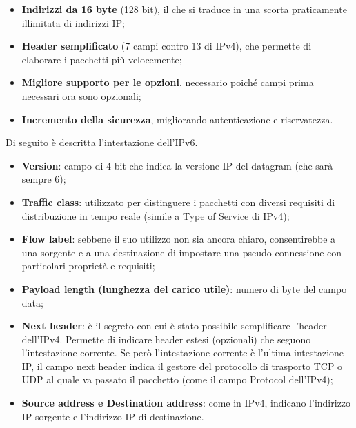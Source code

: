             \begin{itemize}
                \item \textbf{Indirizzi da 16 byte} (128 bit), il che si traduce in una scorta praticamente illimitata di
                indirizzi IP;

                \item \textbf{Header semplificato} (7 campi contro 13 di IPv4), che permette di elaborare i pacchetti
                più velocemente;

                \item \textbf{Migliore supporto per le opzioni}, necessario poiché campi prima necessari ora sono
                opzionali;

                \item \textbf{Incremento della sicurezza}, migliorando autenticazione e riservatezza.                
            \end{itemize}

            Di seguito è descritta l’intestazione dell’IPv6.
            
            \begin{itemize}
                \item \textbf{Version}: campo di 4 bit che indica la versione IP del datagram (che sarà sempre 6);
                
                \item \textbf{Traffic class}: utilizzato per distinguere i pacchetti con diversi requisiti di distribuzione
                in tempo reale (simile a Type of Service di IPv4);

                \item \textbf{Flow label}: sebbene il suo utilizzo non sia ancora chiaro, consentirebbe a una sorgente e
                a una destinazione di impostare una pseudo-connessione con particolari proprietà e
                requisiti;

                \item \textbf{Payload length (lunghezza del carico utile)}: numero di byte del campo data;
                
                \item \textbf{Next header}: è il segreto con cui è stato possibile semplificare l’header dell’IPv4.
                Permette di indicare header estesi (opzionali) che seguono l’intestazione corrente. Se
                però l’intestazione corrente è l’ultima intestazione IP, il campo next header indica il
                gestore del protocollo di trasporto TCP o UDP al quale va passato il pacchetto (come il
                campo Protocol dell’IPv4);

                \item \textbf{Source address e Destination address}: come in IPv4, indicano l’indirizzo IP sorgente e
                l’indirizzo IP di destinazione.
            \end{itemize}

